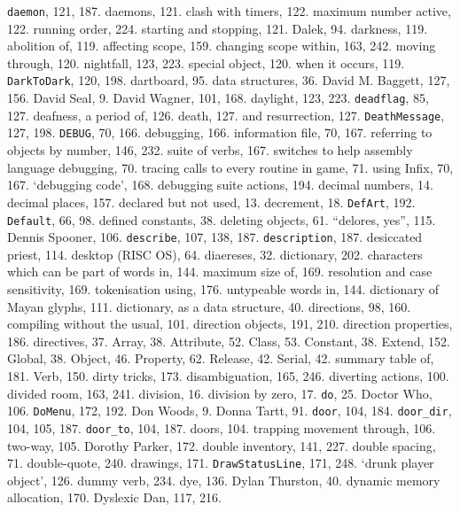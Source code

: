 {{\tt daemon}}, 121, 187.
daemons, 121.
\quad  clash with timers, 122.
\quad  maximum number active, 122.
\quad  running order, 224.
\quad  starting and stopping, 121.
Dalek, 94.
darkness, 119.
\quad  abolition of, 119.
\quad  affecting scope, 159.
\quad  changing scope within, 163, 242.
\quad  moving through, 120.
\quad  nightfall, 123, 223.
\quad  special object, 120.
\quad  when it occurs, 119.
{{\tt DarkToDark}}, 120, 198.
dartboard, 95.
data structures, 36.
David M. Baggett, 127, 156.
David Seal, 9.
David Wagner, 101, 168.
daylight, 123, 223.
{{\tt deadflag}}, 85, 127.
deafness, a period of, 126.
death, 127.
\quad  and resurrection, 127.
{{\tt DeathMessage}}, 127, 198.
{{\tt DEBUG}}, 70, 166.
debugging, 166.
\quad  information file, 70, 167.
\quad  referring to objects by number, 146, 232.
\quad  suite of verbs, 167.
\quad  switches to help assembly language debugging, 70.
\quad  tracing calls to every routine in game, 71.
\quad  using Infix, 70, 167.
`debugging code', 168.
debugging suite actions, 194.
decimal numbers, 14.
decimal places, 157.
declared but not used, 13.
decrement, 18.
{{\tt DefArt}}, 192.
{{\tt Default}}, 66, 98.
defined constants, 38.
deleting objects, 61.
``delores, yes'', 115.
Dennis Spooner, 106.
{{\tt describe}}, 107, 138, 187.
{{\tt description}}, 187.
desiccated priest, 114.
desktop (RISC OS), 64.
diaereses, 32.
dictionary, 202.
\quad  characters which can be part of words in, 144.
\quad  maximum size of, 169.
\quad  resolution and case sensitivity, 169.
\quad  tokenisation using, 176.
\quad  untypeable words in, 144.
dictionary of Mayan glyphs, 111.
dictionary, as a data structure, 40.
directions, 98, 160.
\quad  compiling without the usual, 101.
\quad  direction objects, 191, 210.
\quad  direction properties, 186.
directives, 37.
\quad  Array, 38.
\quad  Attribute, 52.
\quad  Class, 53.
\quad  Constant, 38.
\quad  Extend, 152.
\quad  Global, 38.
\quad  Object, 46.
\quad  Property, 62.
\quad  Release, 42.
\quad  Serial, 42.
\quad  summary table of, 181.
\quad  Verb, 150.
dirty tricks, 173.
disambiguation, 165, 246.
diverting actions, 100.
divided room, 163, 241.
division, 16.
division by zero, 17.
{{\tt do}}, 25.
Doctor Who, 106.
{{\tt DoMenu}}, 172, 192.
Don Woods, 9.
Donna Tartt, 91.
{{\tt door}}, 104, 184.
{{\tt door\_dir}}, 104, 105, 187.
{{\tt door\_to}}, 104, 187.
doors, 104.
\quad  trapping movement through, 106.
\quad  two-way, 105.
Dorothy Parker, 172.
double inventory, 141, 227.
double spacing, 71.
double-quote, 240.
drawings, 171.
{{\tt DrawStatusLine}}, 171, 248.
`drunk player object', 126.
dummy verb, 234.
dye, 136.
Dylan Thurston, 40.
dynamic memory allocation, 170.
Dyslexic Dan, 117, 216.

